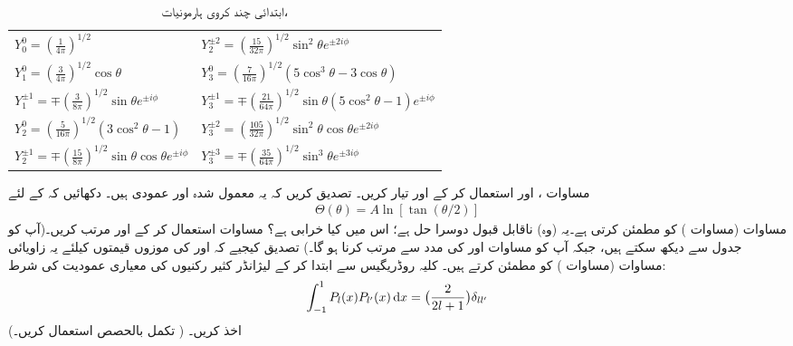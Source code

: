 \begin{table}
\caption{ابتدائی چند کروی ہارمونیات، }
\label{جدول_ابعادی_کروی_ہارمونیات}
\renewcommand{\arraystretch}{2} 
\centering
\begin{tabular}{ll}
$Y_0^0=(\frac{1}{4\pi})^{1/2}$ & $Y_2^{\pm 2}=(\frac{15}{32\pi})^{1/2}\sin^2\theta e^{\pm 2 i \phi}$\\
$Y_1^0=(\frac{3}{4\pi})^{1/2}\cos\theta$ & $Y_3^0=(\frac{7}{16\pi})^{1/2}(5\cos^3\theta-3\cos\theta)$\\
$Y_1^{\pm 1}=\mp(\frac{3}{8\pi})^{1/2}\sin\theta e^{\pm i\phi}$ & $Y_3^{\pm 1}=\mp(\frac{21}{64\pi})^{1/2}\sin\theta(5\cos^2\theta-1)e^{\pm i\phi}$\\
$Y_2^0=(\frac{5}{16\pi})^{1/2}(3\cos^2\theta-1)$ & $Y_3^{\pm 2}=(\frac{105}{32\pi})^{1/2}\sin^2\theta\cos\theta e^{\pm 2 i \phi}$\\
$Y_2^{\pm 1}=\mp(\frac{15}{8\pi})^{1/2}\sin\theta\cos\theta e^{\pm i\phi}$ & $Y_3^{\pm3}=\mp(\frac{35}{64\pi})^{1/2}\sin^3\theta e^{\pm 3 i \phi}$
\end{tabular}
\end{table}
مساوات ،  اور  استعمال 
کر کے  اور  تیار کریں۔ تصدیق کریں کہ یہ معمول شدہ اور عمودی ہیں۔
%
دکھائیں کہ  کے لئے
\begin{align*}
\Theta(\theta)=A\ln[\tan(\theta/2)] 
\end{align*}
 مساوات  (مساوات ) کو مطمئن کرتی ہے۔یہ (وہ) ناقابل قبول دوسرا حل ہے؛ اس میں کیا خرابی ہے؟
%
مساوات  استعمال کر کے  اور 
 مرتب کریں۔(آپ  کو  جدول  سے دیکھ سکتے ہیں، جبکہ  آپ کو مساوات  اور  کی مدد سے  مرتب کرنا  ہو گا۔) تصدیق کیجیے کہ   اور  کی موزوں قیمتوں کیلئے یہ زاویائی مساوات (مساوات ) کو  مطمئن کرتے ہیں۔
%
کلیہ روڈریگیس سے ابتدا کر کے  لیژانڈر  کثیر رکنیوں کی معیاری عمودیت کی شرط:
\begin{align}
\int_{-1}^{1}P_{l}(x)P_{l'}(x)\dif x=\big(\frac{2}{2l+1}\big)\delta_{ll'} 
\end{align}
اخذ کریں۔ ( تکمل بالحصص استعمال کریں۔)


